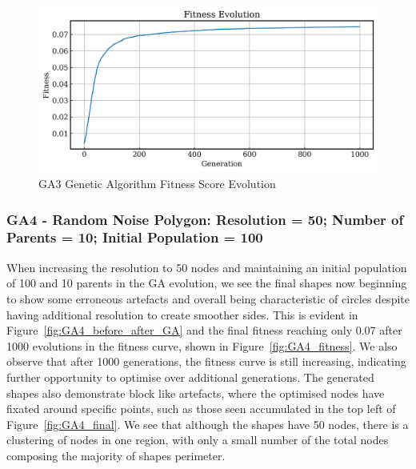 \documentclass{article}
\begin{document}
\begin{figure}[H]
    \centering
    \includegraphics[width=0.75\linewidth]{figures/GAResults/GA3/1000gens_10pars_100initpop_5pcent_mut.png}
    \caption{GA3 Genetic Algorithm Fitness Score Evolution}
    \label{fig:GA3_fitness}
\end{figure}

\subsubsection*{GA4 - Random Noise Polygon: Resolution = 50; Number of Parents = 10; Initial Population = 100}
When increasing the resolution to 50 nodes and maintaining an initial population of 100 and 10 parents in the GA evolution, we see the final shapes now beginning to show some erroneous artefacts and overall being characteristic of circles despite having additional resolution to create smoother sides. This is evident in Figure~\ref{fig:GA4_before_after_GA} and the final fitness reaching only 0.07 after 1000 evolutions in the fitness curve, shown in Figure~\ref{fig:GA4_fitness}. We also observe that after 1000 generations, the fitness curve is still increasing, indicating further opportunity to optimise over additional generations. The generated shapes also demonstrate block like artefacts, where the optimised nodes have fixated around specific points, such as those seen accumulated in the top left of Figure~\ref{fig:GA4_final}. We see that although the shapes have 50 nodes, there is a clustering of nodes in one region, with only a small number of the total nodes composing the majority of shapes perimeter.
\end{document}
